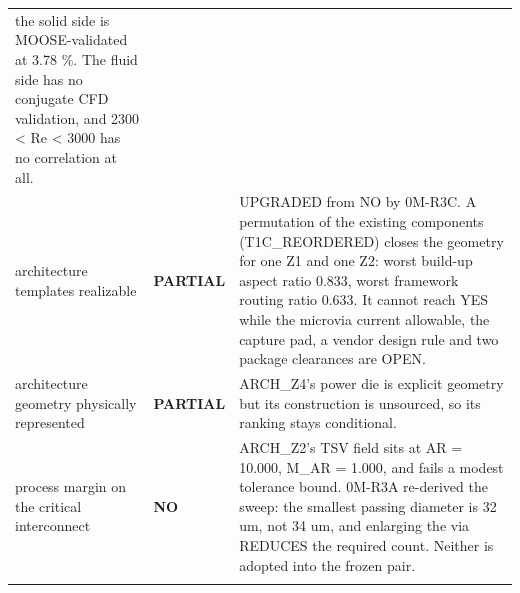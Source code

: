 \documentclass[10pt,]{article}
\begin{document}
\begin{longtable}[]{@{}lll@{}}
\begin{minipage}[t]{0.30\columnwidth}
the solid side is MOOSE-validated at 3.78 \%. The fluid side has no
conjugate CFD validation, and 2300 \textless{} Re \textless{} 3000 has
no correlation at all.\strut
\end{minipage}\tabularnewline
\begin{minipage}[t]{0.30\columnwidth}\raggedright
architecture templates realizable\strut
\end{minipage} & \begin{minipage}[t]{0.30\columnwidth}\raggedright
\textbf{PARTIAL}\strut
\end{minipage} & \begin{minipage}[t]{0.30\columnwidth}\raggedright
UPGRADED from NO by 0M-R3C. A permutation of the existing components
(T1C\_REORDERED) closes the geometry for one Z1 and one Z2: worst
build-up aspect ratio 0.833, worst framework routing ratio 0.633. It
cannot reach YES while the microvia current allowable, the capture pad,
a vendor design rule and two package clearances are OPEN.\strut
\end{minipage}\tabularnewline
\begin{minipage}[t]{0.30\columnwidth}\raggedright
architecture geometry physically represented\strut
\end{minipage} & \begin{minipage}[t]{0.30\columnwidth}\raggedright
\textbf{PARTIAL}\strut
\end{minipage} & \begin{minipage}[t]{0.30\columnwidth}\raggedright
ARCH\_Z4's power die is explicit geometry but its construction is
unsourced, so its ranking stays conditional.\strut
\end{minipage}\tabularnewline
\begin{minipage}[t]{0.30\columnwidth}\raggedright
process margin on the critical interconnect\strut
\end{minipage} & \begin{minipage}[t]{0.30\columnwidth}\raggedright
\textbf{NO}\strut
\end{minipage} & \begin{minipage}[t]{0.30\columnwidth}\raggedright
ARCH\_Z2's TSV field sits at AR = 10.000, M\_AR = 1.000, and fails a
modest tolerance bound. 0M-R3A re-derived the sweep: the smallest
passing diameter is 32 um, not 34 um, and enlarging the via REDUCES the
required count. Neither is adopted into the frozen pair.\strut
\end{minipage}\tabularnewline
\begin{minipage}[t]{0.30\columnwidth}\raggedright

\end{minipage}
\end{longtable}
\end{document}
